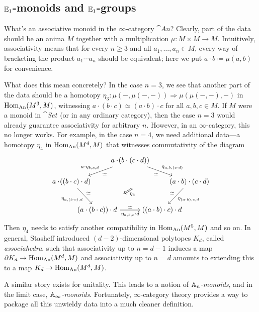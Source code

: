 \subsection{\texorpdfstring{$\mathbb{E}_1$}{E-1}-monoids and \texorpdfstring{$\mathbb{E}_1$}{E1}-groups}\label{subsec:E1}
\begin{numpar}[Associahedra.]\label{par:AssociahedraI}
	What's an associative monoid in the $\infty$-category $\cat{An}$? Clearly, part of the data should be an anima $M$ together with a multiplication $\mu\colon M\times M\rightarrow M$. Intuitively, associativity means that for every $n\geqslant 3$ and all $a_1,\dotsc,a_n\in M$, every way of bracketing the product $a_1\dotsb a_n$ should be equivalent; here we put $a\cdot b\coloneqq \mu(a,b)$ for convenience.
	
	What does this mean concretely? In the case $n=3$, we see that another part of the data should be a homotopy $\eta_3\colon \mu(-,\mu(-,-))\Rightarrow \mu(\mu(-,-),-)$ in $\operatorname{Hom}_{\mathrm{An}}(M^3,M)$, witnessing $a\cdot(b\cdot c)\simeq (a\cdot b)\cdot c$ for all $a,b,c\in M$. If $M$ were a monoid in $\cat{Set}$ (or in any ordinary category), then the case $n=3$ would already guarantee associativity for arbitrary $n$. However, in an $\infty$-category, this no longer works. For example, in the case $n=4$, we need additional data---a homotopy $\eta_4$ in $\operatorname{Hom}_{\mathrm{An}}(M^4,M)$ that witnesses commutativity of the diagram
	\begin{equation*}
		\begin{tikzcd}
			&[-5em] &[-4.125em] a\cdot\lef(b\cdot(c\cdot d)\righ)\ar[dll,"a\cdot \eta_{b,c,d}"',"\simeq"]\ar[drr,"\eta_{a,b,(c\cdot d)}","\simeq"']\ar[drr,phantom,""{name=A}]\arrow[from=A,to=3-2,end anchor=center,draw=none,"\Longleftarrow"{sloped,marking,pos=0.5},"\eta_4"] &[-4.125em] &[-5em] \\[-0.5em]
			a\cdot \lef((b\cdot c)\cdot d\righ)\drar["\eta_{a,(b\cdot c),d}"',"\simeq"] & & & & (a\cdot b)\cdot (c\cdot d)\dlar["\eta_{(a\cdot b),c,d}","\simeq"'] \\[0.5em]
			& \lef(a\cdot (b\cdot c)\righ)\cdot d\ar[rr,"\eta_{a,b,c}\cdot d"',"\simeq"] & & \lef((a\cdot b)\cdot c\righ)\cdot d & 
		\end{tikzcd}
	\end{equation*}
	Then $\eta_4$ needs to satisfy another compatibility in $\operatorname{Hom}_{\mathrm{An}}(M^5,M)$ and so on. In general, Stasheff \cite{Stasheff} introduced $(d-2)$-dimensional polytopes $K_d$, called \emph{associahedra}, such that associativity up to $n=d-1$ induces a map $\partial K_d\rightarrow \operatorname{Hom}_{\mathrm{An}}(M^d,M)$ and associativity up to $n=d$ amounts to extending this to a map $K_d\rightarrow\operatorname{Hom}_{\mathrm{An}}(M^d,M)$.
	
	A similar story exists for unitality. This leads to a notion of \emph{$\mathbb{A}_n$-monoids}, and in the limit case, \emph{$\mathbb{A}_\infty$-monoids}. Fortunately, $\infty$-category theory provides a way to package all this unwieldy data into a much cleaner definition.
\end{numpar}

